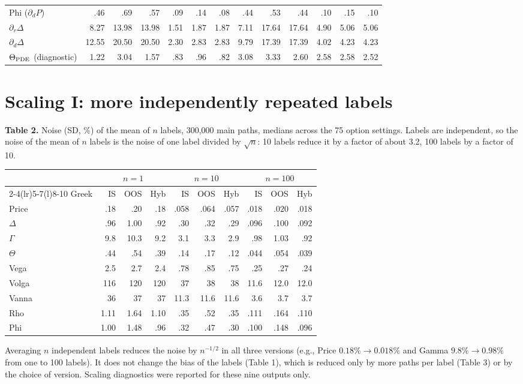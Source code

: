 \documentclass[10pt,letterpaper]{article}
\begin{document}
\begin{center}
\begin{tabular}{@{}lrrrrrrrrrrrr@{}}
Phi ($\partial_dP$) & .46 & .69 & .57 & .09 & .14 & .08 & .44 & .53 & .44 & .10 & .15 & .10 \\
$\partial_r\Delta$ & 8.27 & 13.98 & 13.98 & 1.51 & 1.87 & 1.87 & 7.11 & 17.64 & 17.64 & 4.90 & 5.06 & 5.06 \\
$\partial_d\Delta$ & 12.55 & 20.50 & 20.50 & 2.30 & 2.83 & 2.83 & 9.79 & 17.39 & 17.39 & 4.02 & 4.23 & 4.23 \\
$\Theta_{\rm PDE}$ (diagnostic) & 1.22 & 3.04 & 1.57 & .83 & .96 & .82 & 3.08 & 3.33 & 2.60 & 2.58 & 2.58 & 2.52 \\
\bottomrule
\end{tabular}
\end{center}

\section*{Scaling I: more independently repeated labels}
\textbf{Table 2.} Noise (SD, \%) of the mean of $n$ labels, 300,000 main paths, medians across the 75
option settings. Labels are independent, so the noise of the mean of $n$ labels is the noise of one
label divided by $\sqrt{n}$: 10 labels reduce it by a factor of about 3.2, 100 labels by a factor of 10.
\begin{center}
\fontsize{8.2}{9.5}\selectfont
\setlength{\tabcolsep}{4.6pt}
\begin{tabular}{@{}lrrrrrrrrr@{}}
\toprule
& \multicolumn{3}{c}{$n=1$} & \multicolumn{3}{c}{$n=10$} & \multicolumn{3}{c}{$n=100$}\\
\cmidrule(lr){2-4}\cmidrule(lr){5-7}\cmidrule(l){8-10}
Greek & IS & OOS & Hyb & IS & OOS & Hyb & IS & OOS & Hyb\\
\midrule
Price & .18 & .20 & .18 & .058 & .064 & .057 & .018 & .020 & .018 \\
$\Delta$ & .96 & 1.00 & .92 & .30 & .32 & .29 & .096 & .100 & .092 \\
$\Gamma$ & 9.8 & 10.3 & 9.2 & 3.1 & 3.3 & 2.9 & .98 & 1.03 & .92 \\
$\Theta$ & .44 & .54 & .39 & .14 & .17 & .12 & .044 & .054 & .039 \\
Vega & 2.5 & 2.7 & 2.4 & .78 & .85 & .75 & .25 & .27 & .24 \\
Volga & 116 & 120 & 120 & 37 & 38 & 38 & 11.6 & 12.0 & 12.0 \\
Vanna & 36 & 37 & 37 & 11.3 & 11.6 & 11.6 & 3.6 & 3.7 & 3.7 \\
Rho & 1.11 & 1.64 & 1.10 & .35 & .52 & .35 & .111 & .164 & .110 \\
Phi & 1.00 & 1.48 & .96 & .32 & .47 & .30 & .100 & .148 & .096 \\
\bottomrule
\end{tabular}
\end{center}
Averaging $n$ independent labels reduces the noise by $n^{-1/2}$ in all three versions (e.g., Price
$0.18\%\rightarrow0.018\%$ and Gamma $9.8\%\rightarrow0.98\%$ from one to 100 labels). It does not
change the bias of the labels (Table 1), which is reduced only by more paths per label (Table 3) or by
the choice of version. Scaling diagnostics were reported for these nine outputs only.
\end{document}
